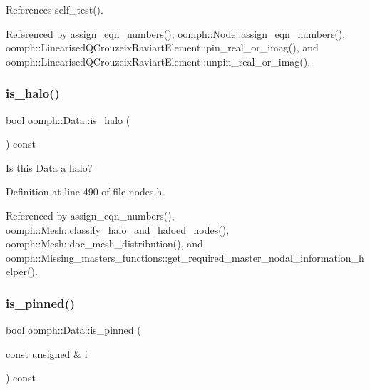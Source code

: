 References self\+\_\+test().



Referenced by assign\+\_\+eqn\+\_\+numbers(), oomph\+::\+Node\+::assign\+\_\+eqn\+\_\+numbers(), oomph\+::\+Linearised\+Q\+Crouzeix\+Raviart\+Element\+::pin\+\_\+real\+\_\+or\+\_\+imag(), and oomph\+::\+Linearised\+Q\+Crouzeix\+Raviart\+Element\+::unpin\+\_\+real\+\_\+or\+\_\+imag().

\mbox{\label{classoomph_1_1Data_a6227d2775850d6cf482d8af0afc50f5c}} 
\subsubsection{\texorpdfstring{is\+\_\+halo()}{is\_halo()}}
{\footnotesize\ttfamily bool oomph\+::\+Data\+::is\+\_\+halo (\begin{DoxyParamCaption}{ }\end{DoxyParamCaption}) const\hspace{0.3cm}{\ttfamily [inline]}}



Is this \hyperlink{classoomph_1_1Data}{Data} a halo? 



Definition at line 490 of file nodes.\+h.



Referenced by assign\+\_\+eqn\+\_\+numbers(), oomph\+::\+Mesh\+::classify\+\_\+halo\+\_\+and\+\_\+haloed\+\_\+nodes(), oomph\+::\+Mesh\+::doc\+\_\+mesh\+\_\+distribution(), and oomph\+::\+Missing\+\_\+masters\+\_\+functions\+::get\+\_\+required\+\_\+master\+\_\+nodal\+\_\+information\+\_\+helper().

\mbox{\label{classoomph_1_1Data_aedd0c445396ddcd650c814d17fef77dc}} 
\subsubsection{\texorpdfstring{is\+\_\+pinned()}{is\_pinned()}}
{\footnotesize\ttfamily bool oomph\+::\+Data\+::is\+\_\+pinned (\begin{DoxyParamCaption}\item[{const unsigned \&}]{i }\end{DoxyParamCaption}) const\hspace{0.3cm}{\ttfamily [inline]}}



